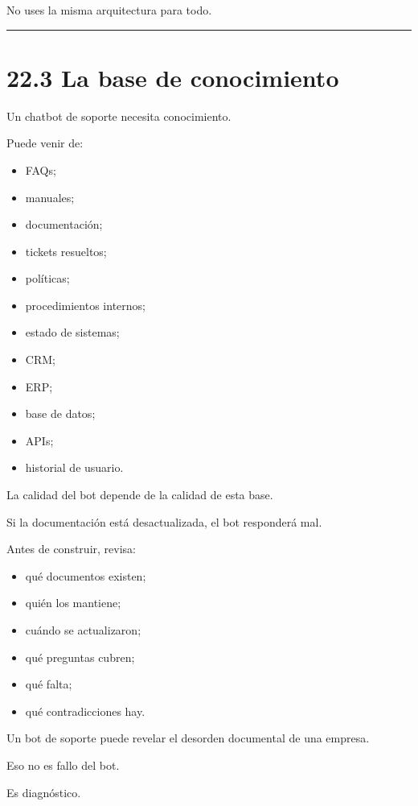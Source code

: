 No uses la misma arquitectura para todo.

\begin{center}\rule{0.5\linewidth}{0.5pt}\end{center}

\section{22.3 La base de conocimiento}\label{la-base-de-conocimiento}

Un chatbot de soporte necesita conocimiento.

Puede venir de:

\begin{itemize}
\tightlist
\item
  FAQs;
\item
  manuales;
\item
  documentación;
\item
  tickets resueltos;
\item
  políticas;
\item
  procedimientos internos;
\item
  estado de sistemas;
\item
  CRM;
\item
  ERP;
\item
  base de datos;
\item
  APIs;
\item
  historial de usuario.
\end{itemize}

La calidad del bot depende de la calidad de esta base.

Si la documentación está desactualizada, el bot responderá mal.

Antes de construir, revisa:

\begin{itemize}
\tightlist
\item
  qué documentos existen;
\item
  quién los mantiene;
\item
  cuándo se actualizaron;
\item
  qué preguntas cubren;
\item
  qué falta;
\item
  qué contradicciones hay.
\end{itemize}

Un bot de soporte puede revelar el desorden documental de una empresa.

Eso no es fallo del bot.

Es diagnóstico.


